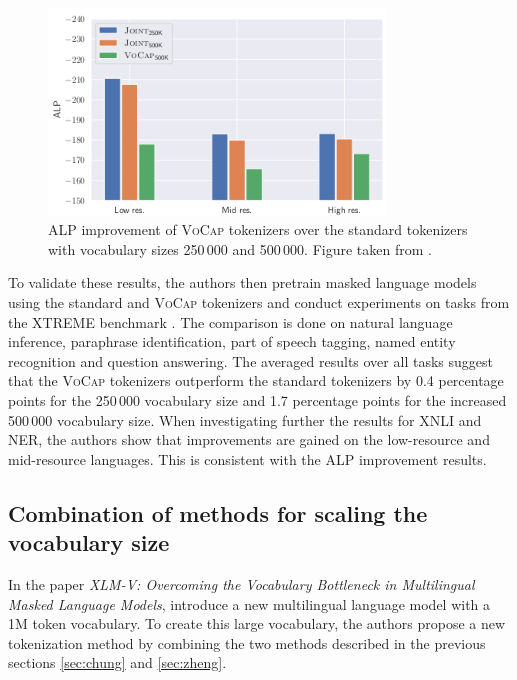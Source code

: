 \begin{figure}
    \centering
    \includegraphics[width=0.8\textwidth]{img/temp/alp_improvement.png}
    \caption{ALP improvement of \textsc{VoCap} tokenizers over the standard tokenizers with vocabulary sizes 250\,000 and 500\,000. Figure taken from \cite{zheng_allocating_2021}.}
    \label{fig:alp_improvement}
\end{figure}

To validate these results, the authors then pretrain masked language models using the standard and \textsc{VoCap} tokenizers and conduct experiments on tasks from the XTREME benchmark \cite{hu_xtreme_nodate}. The comparison is done on natural language inference, paraphrase identification, part of speech tagging, named entity recognition and question answering. The averaged results over all tasks suggest that the \textsc{VoCap} tokenizers outperform the standard tokenizers by 0.4 percentage points for the 250\,000 vocabulary size and 1.7 percentage points for the increased 500\,000 vocabulary size. When investigating further the results for XNLI and NER, the authors show that improvements are gained on the low-resource and mid-resource languages. This is consistent with the ALP improvement results.



\subsection{Combination of methods for scaling the vocabulary size}

In the paper \textit{XLM-V: Overcoming the Vocabulary Bottleneck in Multilingual Masked Language Models}, \citeauthor{liang_xlm-v_2023} introduce a new multilingual language model with a 1M token vocabulary. To create this large vocabulary, the authors propose a new tokenization method by combining the two methods described in the previous sections \ref{sec:chung} and \ref{sec:zheng}. 

